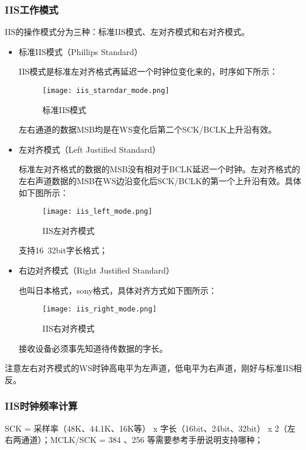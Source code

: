 \subsubsection{IIS工作模式}
IIS的操作模式分为三种：标准IIS模式、左对齐模式和右对齐模式。
\begin{itemize}
\item 标准IIS模式（Phillips Standard）

IIS模式是标准左对齐格式再延迟一个时钟位变化来的，时序如下所示：
\begin{figure}[H]
\centering
\texttt{[image: iis\_starndar\_mode.png]}
\caption{标准IIS模式}
\end{figure}
左右通道的数据MSB均是在WS变化后第二个SCK/BCLK上升沿有效。

\item 左对齐模式（Left Justified Standard）

标准左对齐格式的数据的MSB没有相对于BCLK延迟一个时钟。左对齐格式的左右声道数据的MSB在WS边沿变化后SCK/BCLK的第一个上升沿有效。具体如下图所示：
\begin{figure}[H]
\centering
\texttt{[image: iis\_left\_mode.png]}
\caption{IIS左对齐模式}
\end{figure}
支持16~32bit字长格式；

\item 右边对齐模式（Right Justified Standard）

也叫日本格式，sony格式，具体对齐方式如下图所示：
\begin{figure}[H]
\centering
\texttt{[image: iis\_right\_mode.png]}
\caption{IIS右对齐模式}
\end{figure}
接收设备必须事先知道待传数据的字长。

\end{itemize}

\begin{messagebox}
注意左右对齐模式的WS时钟高电平为左声道，低电平为右声道，刚好与标准IIS相反。
\end{messagebox}

\subsubsection{IIS时钟频率计算}
SCK = 采样率（48K、44.1K、16K等） x  字长（16bit、24bit、32bit） x 2（左右两通道）；MCLK/SCK =  384 、256 等需要参考手册说明支持哪种；


